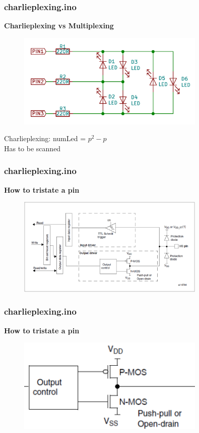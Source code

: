 \documentclass[t]{beamer}
\begin{document}
\begin{frame}[t]
\frametitle{charlieplexing.ino}
\textbf{Charlieplexing vs Multiplexing}

\begin{figure}
	\includegraphics[width=0.8\textwidth]{charliePlexing.png}
\end{figure}
\centering
Charlieplexing: numLed = $p^2-p$ \\
Has to be scanned

\end{frame}


\begin{frame}[t]
\frametitle{charlieplexing.ino}
\textbf{How to tristate a pin}

\begin{figure}
	\includegraphics[width=0.8\textwidth]{gpioOutput.png}
\end{figure}


\end{frame}


\begin{frame}[t]
\frametitle{charlieplexing.ino}
\textbf{How to tristate a pin}

\begin{figure}
	\includegraphics[width=0.8\textwidth]{gpioOutputClose.png}
\end{figure}

\end{frame}
\end{document}
